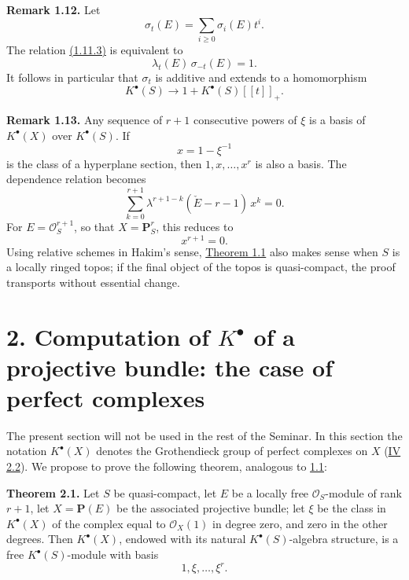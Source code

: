 \textbf{Remark 1.12.} Let
\[
  \sigma_t(E)=\sum_{i\geq 0}\sigma_i(E)t^i .
\]
The relation \hyperlink{sga6.e06.eq.1-11-3}{(1.11.3)} is equivalent to
\[
  \lambda_t(E)\,\sigma_{-t}(E)=1.
\]
It follows in particular that \(\sigma_t\) is additive and extends to a homomorphism
\[
  K^\bullet(S)\longrightarrow 1+K^\bullet(S)[[t]]_+ .
\]

\textbf{Remark 1.13.} Any sequence of \(r+1\) consecutive powers of \(\xi\) is a basis of \(K^\bullet(X)\) over \(K^\bullet(S)\). If
\[
  x=1-\xi^{-1}
\]
is the class of a hyperplane section, then \(1,x,\ldots,x^r\) is also a basis. The dependence relation becomes
\begin{equation}\tag{1.13.1}
  \sum_{k=0}^{r+1}\lambda^{r+1-k}(\check E-r-1)\,x^k=0.
\end{equation}
For \(E=\mathcal O_S^{r+1}\), so that \(X=\mathbf P^r_S\), this reduces to
\[
  x^{r+1}=0.
\]
Using relative schemes in Hakim's sense, \hyperlink{sga6.e06.thm.1-1}{Theorem 1.1} also makes sense when \(S\) is a locally ringed topos; if the final object of the topos is quasi-compact, the proof transports without essential change.

\section*{2. Computation of \(K^\bullet\) of a projective bundle: the case of perfect complexes}

The present section will not be used in the rest of the Seminar. In this section the notation \(K^\bullet(X)\) denotes the Grothendieck group of perfect complexes on \(X\) (\hyperlink{sga6.e04.def.2-2}{IV 2.2}). We propose to prove the following theorem, analogous to \hyperlink{sga6.e06.thm.1-1}{1.1}:

\textbf{Theorem 2.1.} Let \(S\) be quasi-compact, let \(E\) be a locally free \(\mathcal O_S\)-module of rank \(r+1\), let \(X=\mathbf P(E)\) be the associated projective bundle; let \(\xi\) be the class in \(K^\bullet(X)\) of the complex equal to \(\mathcal O_X(1)\) in degree zero, and zero in the other degrees. Then \(K^\bullet(X)\), endowed with its natural \(K^\bullet(S)\)-algebra structure, is a free \(K^\bullet(S)\)-module with basis
\[
  1,\xi,\ldots,\xi^r .
\]

